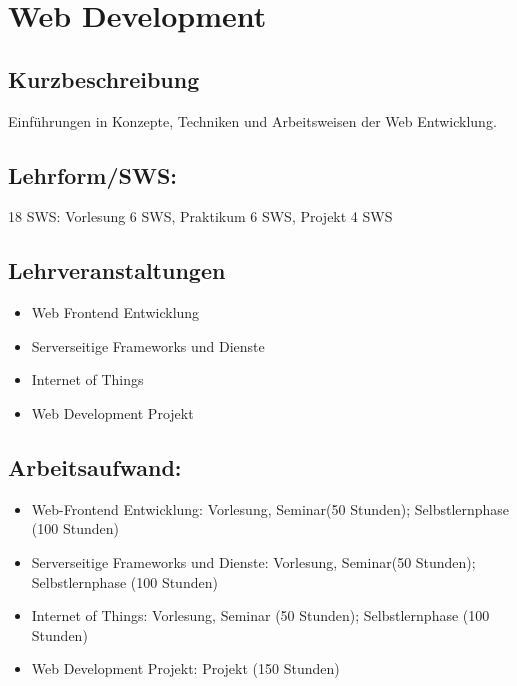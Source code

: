 \chapter{Web Development}\label{web-development}

\section{Kurzbeschreibung}\label{kurzbeschreibung-6}

Einführungen in Konzepte, Techniken und Arbeitsweisen der Web
Entwicklung.

\section{Lehrform/SWS:}\label{lehrformsws-30}

18 SWS: Vorlesung 6 SWS, Praktikum 6 SWS, Projekt 4 SWS

\section{Lehrveranstaltungen}\label{lehrveranstaltungen-1}

\begin{itemize}
\tightlist
\item
  Web Frontend Entwicklung
\item
  Serverseitige Frameworks und Dienste
\item
  Internet of Things
\item
  Web Development Projekt
\end{itemize}

\section{Arbeitsaufwand:}\label{arbeitsaufwand-29}

\begin{itemize}
\item
  Web-Frontend Entwicklung: Vorlesung, Seminar(50 Stunden);
  Selbstlernphase (100 Stunden)
\item
  Serverseitige Frameworks und Dienste: Vorlesung, Seminar(50 Stunden);
  Selbstlernphase (100 Stunden)
\item
  Internet of Things: Vorlesung, Seminar (50 Stunden); Selbstlernphase
  (100 Stunden)
\item
  Web Development Projekt: Projekt (150 Stunden)
\end{itemize}

